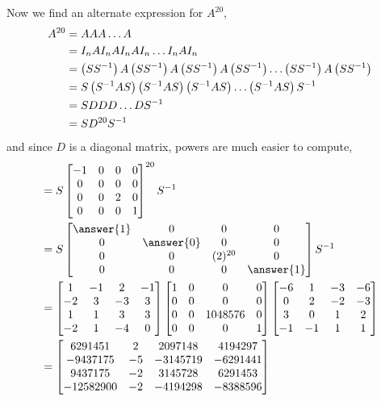 \documentclass{ximera}
\begin{document}
\begin{example}
Now we find an alternate expression for $A^{20}$,
\begin{align*}
A^{20}
&=AAA\ldots A\\
&=I_nAI_nAI_nAI_n\ldots I_nAI_n\\
&=\left(SS^{-1}\right)A\left(SS^{-1}\right)A\left(SS^{-1}\right)A\left(SS^{-1}\right)\ldots
\left(SS^{-1}\right)A\left(SS^{-1}\right)\\
&=S\left(S^{-1}AS\right)\left(S^{-1}AS\right)\left(S^{-1}AS\right)\ldots \left(S^{-1}AS\right)S^{-1}\\
&=SDDD\ldots DS^{-1}\\
&=SD^{20}S^{-1}
\end{align*}
and since $D$ is a diagonal matrix, powers are much easier to compute,
\begin{align*}
&=
S
\begin{bmatrix}
 -1 & 0 & 0 & 0 \\
 0 & 0 & 0 & 0 \\
 0 & 0 & 2 & 0 \\
 0 & 0 & 0 & 1
\end{bmatrix}^{20}
\inverse{S}\\
&=
S
\begin{bmatrix}
 \answer{1} & 0 & 0 & 0 \\
 0 & \answer{0} & 0 & 0 \\
 0 & 0 & (2)^{20} & 0 \\
 0 & 0 & 0 & \answer{1}
\end{bmatrix}
\inverse{S}\\
&=
\begin{bmatrix}
 1 & -1 & 2 & -1 \\
 -2 & 3 & -3 & 3 \\
 1 & 1 & 3 & 3 \\
 -2 & 1 & -4 & 0
\end{bmatrix}
\begin{bmatrix}
 1 & 0 & 0 & 0 \\
 0 & 0 & 0 & 0 \\
 0 & 0 & 1048576 & 0 \\
 0 & 0 & 0 & 1
\end{bmatrix}
\begin{bmatrix}
 -6 & 1 & -3 & -6 \\
 0 & 2 & -2 & -3 \\
 3 & 0 & 1 & 2 \\
 -1 & -1 & 1 & 1
\end{bmatrix}\\
&=
\begin{bmatrix}
 6291451 & 2 & 2097148 & 4194297 \\
 -9437175 & -5 & -3145719 & -6291441 \\
 9437175 & -2 & 3145728 &  6291453 \\
 -12582900 & -2 & -4194298 & -8388596
\end{bmatrix}
\end{align*}


\end{example}
\end{document}
